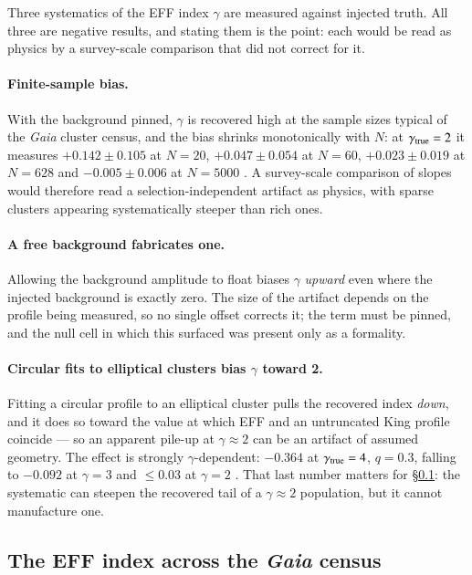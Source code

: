 \documentclass{aa}
\begin{document}
Three systematics of the EFF index $\gamma$ are measured against injected truth. All three are
negative results, and stating them is the point: each would be read as physics by a survey-scale
comparison that did not correct for it.

\paragraph{Finite-sample bias.} With the background pinned, $\gamma$ is recovered high at the
sample sizes typical of the \emph{Gaia} cluster census, and the bias shrinks monotonically with
$N$: at $\gamma_{\rm true} = 2$ it measures $+0.142 \pm 0.105$ at $N=20$, $+0.047 \pm 0.054$ at
$N=60$, $+0.023 \pm 0.019$ at $N=628$ and $-0.005 \pm 0.006$ at $N=5000$
. A survey-scale comparison of slopes would therefore read a selection-independent artifact as
physics, with sparse clusters appearing systematically steeper than rich ones.

\paragraph{A free background fabricates one.} Allowing the background amplitude to float biases
$\gamma$ \emph{upward} even where the injected background is exactly zero. The size of the
artifact depends on the profile being measured, so no single offset corrects it; the term must be
pinned, and the null cell in which this surfaced was present only as a formality.

\paragraph{Circular fits to elliptical clusters bias $\gamma$ toward 2.} Fitting a circular
profile to an elliptical cluster pulls the recovered index \emph{down}, and it does so toward the
value at which EFF and an untruncated King profile coincide --- so an apparent pile-up at
$\gamma \approx 2$ can be an artifact of assumed geometry. The effect is strongly
$\gamma$-dependent: $-0.364$ at $\gamma_{\rm true} = 4$, $q = 0.3$, falling to $-0.092$ at
$\gamma = 3$ and $\leq 0.03$ at $\gamma = 2$
. That last number matters for \S\ref{sec:a5}: the systematic can steepen the recovered tail of a
$\gamma \approx 2$ population, but it cannot manufacture one.

\subsection{The EFF index across the \emph{Gaia} census}
\label{sec:a5}
\end{document}
